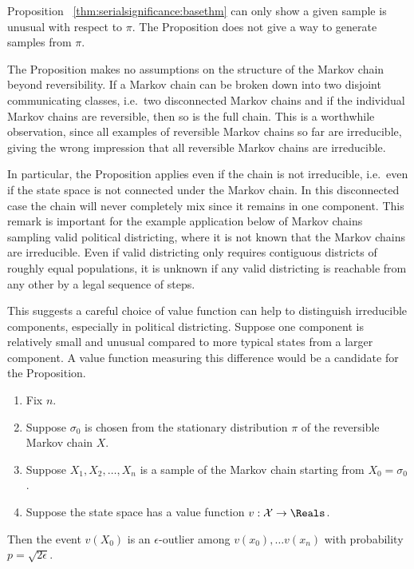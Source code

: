 \documentclass[12pt]{article}
\begin{document}
\begin{remark}
    Proposition~%
    \ref{thm:serialsignificance:basethm} can only show a given sample is
    unusual with respect to \( \pi \).  The Proposition does not give a
    way to generate samples from \( \pi \).
\end{remark}

\begin{remark}
    The Proposition makes no assumptions on the structure of the Markov
    chain beyond reversibility.  If a Markov chain can be broken down
    into two disjoint communicating classes, i.e.\ two disconnected
    Markov chains and if the individual Markov chains are reversible,
    then so is the full chain.  This is a worthwhile observation, since
    all examples of reversible Markov chains so far are irreducible,
    giving the wrong impression that all reversible Markov chains are
    irreducible.

    In particular, the Proposition applies even if the chain is not
    irreducible, i.e.\ even if the state space is not connected under
    the Markov chain.  In this disconnected case the chain will never
    completely mix since it remains in one component.  This remark is
    important for the example application below of Markov chains
    sampling valid political districting, where it is not known that the
    Markov chains are irreducible.  Even if valid districting only
    requires contiguous districts of roughly equal populations, it is
    unknown if any valid districting is reachable from any other by a
    legal sequence of steps.

    This suggests a careful choice of value function can help to
    distinguish irreducible components, especially in political
    districting.  Suppose one component is relatively small and unusual
    compared to more typical states from a larger component.  A value
    function measuring this difference would be a candidate for the
    Proposition.
\end{remark}

\begin{corollary}
    \label{thm:serialsignificance:sqrtepstest}
    \begin{enumerate}
        \item
            Fix \( n \).
        \item
            Suppose \( \sigma_0 \) is chosen from the stationary
            distribution \( \pi \) of the reversible Markov chain \( X \).
        \item
            Suppose \( X_1, X_2, \dots, X_n \) is a sample of the Markov
            chain starting from \( X_0 = \sigma_0 \).
        \item
            Suppose the state space has a value function \( v : \mathcal
            {X} \to \Reals \).
    \end{enumerate}
    Then the event \( v(X_0) \) is an \( \epsilon \)-outlier among \( v(x_0),
    \dots v(x_n ) \) with probability \( p = \sqrt{2\epsilon} \).
\end{corollary}
\end{document}
